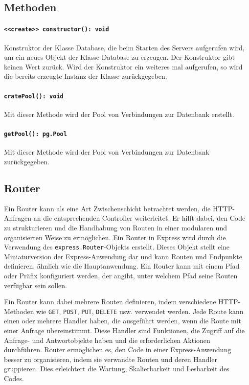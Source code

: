 \documentclass{entwurfsheft}
\begin{document}
\subsection*{Methoden}
\paragraph{\texttt{<<create>> constructor(): void}}
Konstruktor der Klasse Database, die beim Starten des Servers aufgerufen wird, um ein neues Objekt der Klasse Database zu erzeugen. Der Konstruktor gibt keinen Wert zurück.
Wird der Konstruktor ein weiteres mal aufgerufen, so wird die bereits erzeugte Instanz der Klasse zurückgegeben.
\paragraph{\texttt{cratePool(): void}}
Mit dieser Methode wird der Pool von Verbindungen zur Datenbank erstellt.
\paragraph{\texttt{getPool(): pg.Pool}}
Mit dieser Methode wird der Pool von Verbindungen zur Datenbank zurückgegeben.


\subsection{Router}
Ein Router kann als eine Art Zwischenschicht betrachtet werden, die HTTP-Anfragen an die entsprechenden Controller weiterleitet.
Er hilft dabei, den Code zu strukturieren und die Handhabung von Routen in einer modularen und organisierten Weise zu ermöglichen.
Ein Router in Express wird durch die Verwendung des \texttt{express.Router}-Objekts erstellt.
Dieses Objekt stellt eine Miniaturversion der Express-Anwendung dar und kann Routen und Endpunkte definieren, ähnlich wie die Hauptanwendung.
Ein Router kann mit einem Pfad oder Präfix konfiguriert werden, der angibt, unter welchem Pfad seine Routen verfügbar sein sollen.

Ein Router kann dabei mehrere Routen definieren, indem verschiedene HTTP-Methoden wie \texttt{GET}, \texttt{POST}, \texttt{PUT}, \texttt{DELETE} usw. verwendet werden.
Jede Route kann einen oder mehrere Handler haben, die ausgeführt werden, wenn die Route mit einer Anfrage übereinstimmt.
Diese Handler sind Funktionen, die Zugriff auf die Anfrage- und Antwortobjekte haben und die erforderlichen Aktionen durchführen.
Router ermöglichen es, den Code in einer Express-Anwendung besser zu organisieren, indem sie verwandte Routen und deren Handler gruppieren.
Dies erleichtert die Wartung, Skalierbarkeit und Lesbarkeit des Codes.
\end{document}
